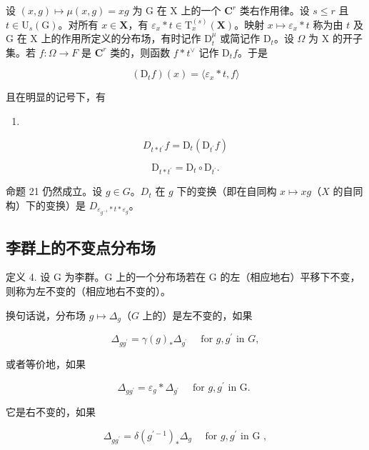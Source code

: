 设 \((x,g)\mapsto \mu (x,g) = xg\) 为 G 在 X 上的一个 \(\mathbf{C}^r\) 类右作用律。设 \(s\leqslant r\) 且 \(t\in \mathrm{U}_{s}(\mathrm{G})\)。对所有 \(x\in \mathbf{X}\)，有 \(\varepsilon_{x}*t\in \mathrm{T}_{x}^{(s)}(\mathbf{X})\)。映射 \(x\mapsto \varepsilon_x*t\) 称为由 \(t\) 及 G 在 X 上的作用所定义的分布场，有时记作 \(\mathrm{D}_{t}^{\mu}\) 或简记作 \(\mathrm{D}_t\)。设 \(\Omega\) 为 X 的开子集。若 \(f:\Omega \to F\) 是 \(\mathbf{C}^r\) 类的，则函数 \(f*t^{\vee}\) 记作 \(\mathrm{D}_t f\)。于是

\[
\left(\mathrm{D} _ {t} f\right) (x) = \langle \varepsilon_ {x} * t, f \rangle\tag{19}
\]

且在明显的记号下，有

\begin{enumerate}
\def\labelenumi{(\arabic{enumi})}
\setcounter{enumi}{19}
\tightlist
\item
\end{enumerate}

\[
D _ {t * t ^ {\prime}} f = \mathrm{D} _ {t} (\mathrm{D} _ {t ^ {\prime}} f)\tag{20}
\]

\[
\mathrm{D} _ {t * t ^ {\prime}} = \mathrm{D} _ {t} \circ \mathrm{D} _ {t ^ {\prime}}\tag{21}.
\]

命题 21 仍然成立。设 \(g \in G\)。\(D_t\) 在 \(g\) 下的变换（即在自同构 \(x \mapsto xg\)（\(X\) 的自同构）下的变换）是 \(D_{\varepsilon_{g^{-1}} * t * \varepsilon_g}\)。

\subsection{李群上的不变点分布场}

定义 4. 设 G 为李群。G 上的一个分布场若在 G 的左（相应地右）平移下不变，则称为左不变的（相应地右不变的）。

换句话说，分布场 \(g \mapsto \Delta_g\)（\(G\) 上的）是左不变的，如果

\[
\Delta_ {g g ^ {\prime}} = \gamma (g) _ {*} \Delta_ {g ^ {\prime}} \quad \text { for } g, g ^ {\prime} \text { in } G,
\]

或者等价地，如果

\[
\Delta_ {g g ^ {\prime}} = \varepsilon_ {g} * \Delta_ {g ^ {\prime}} \quad \text { for   } g, g ^ {\prime} \text {   in   G. }
\]

它是右不变的，如果

\[
\Delta_ {g g ^ {\prime}} = \delta (g ^ {\prime - 1}) _ {*} \Delta_ {g} \quad \text { for   } g, g ^ {\prime} \text {   in   G },
\]

